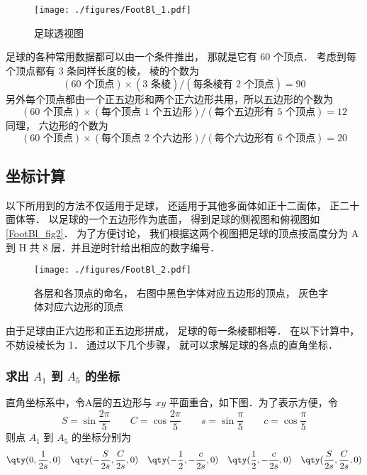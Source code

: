


\begin{figure}[ht]
\centering
\texttt{[image: ./figures/FootBl\_1.pdf]}
\caption{足球透视图} \label{FootBl_fig1}
\end{figure}

足球的各种常用数据都可以由一个条件推出， 那就是它有 60 个顶点． 考虑到每个顶点都有 3 条同样长度的棱， 棱的个数为
\begin{equation}
(\text{60 个顶点}) \times (\text{3 条棱}) / (\text{每条棱有 2 个顶点}) = 90
\end{equation}
另外每个顶点都由一个正五边形和两个正六边形共用，所以五边形的个数为
\begin{equation}
(\text{60 个顶点}) \times (\text{每个顶点 1 个五边形}) / (\text{每个五边形有 5 个顶点}) = 12
\end{equation}
同理， 六边形的个数为
\begin{equation}
(\text{60 个顶点}) \times (\text{每个顶点 2 个六边形}) / (\text{每个六边形有 6 个顶点}) = 20
\end{equation}

\subsection{坐标计算}
以下所用到的方法不仅适用于足球， 还适用于其他多面体如正十二面体， 正二十面体等． 以足球的一个五边形作为底面， 得到足球的侧视图和俯视图如\autoref{FootBl_fig2}． 为了方便讨论， 我们根据这两个视图把足球的顶点按高度分为 A 到 H 共 8 层．并且逆时针给出相应的数字编号．

\begin{figure}[ht]
\centering
\texttt{[image: ./figures/FootBl\_2.pdf]}
\caption{各层和各顶点的命名， 右图中黑色字体对应五边形的顶点， 灰色字体对应六边形的顶点} \label{FootBl_fig2}
\end{figure}

由于足球由正六边形和正五边形拼成， 足球的每一条棱都相等． 在以下计算中， 不妨设棱长为 1． 通过以下几个步骤， 就可以求解足球的各点的直角坐标．

\subsubsection{求出 $A_1$ 到 $A_5$ 的坐标}
直角坐标系中，令A层的五边形与 $xy$ 平面重合，如下图．为了表示方便，令
\begin{equation}
S = \sin\frac{2\pi}{5} \qquad
C = \cos\frac{2\pi}{5} \qquad
s = \sin\frac{\pi}{5} \qquad
c = \cos\frac{\pi}{5}
\end{equation}
则点 $A_1$ 到 $A_5$ 的坐标分别为
\begin{equation}\label{FootBl_eq5}
\qty(0, \frac{1}{2s}, 0) \quad
\qty(-\frac{S}{2s}, \frac{C}{2s}, 0) \quad
\qty(-\frac12, -\frac{c}{2s}, 0) \quad
\qty(\frac12, -\frac{c}{2s}, 0) \quad
\qty(\frac{S}{2s}, \frac{C}{2s}, 0)
\end{equation}

